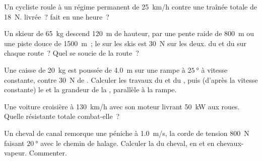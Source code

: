 \begin{exercise}[$\star\star$]\label{exo:g11:work-of-force:7}
Un cycliste roule à un régime permanent de \qty{25}{km/h} contre une
traînée totale de \qty{18}{N}.
 livrée~?
 fait en une heure~?
\end{exercise}

\begin{exercise}[$\star\star$]\label{exo:g11:work-of-force:8}
Un skieur de \qty{65}{kg} descend \qty{120}{m} de hauteur, par une pente
raide de \qty{800}{m} ou une piste douce de \qty{1500}{m}~; le
 sur les skis est \qty{30}{N} sur
les deux.  du
 et du
 sur chaque route~? Quel
 se soucie de la route~?
\end{exercise}

\begin{exercise}[$\star\star$]\label{exo:g11:work-of-force:9}
Une caisse de \qty{20}{kg} est poussée de \qty{4.0}{m} sur une rampe à
$\qty{25}{\degree}$ à vitesse constante, contre \qty{30}{N} de
. Calculer les
travaux du
 et du
, puis (d'après la vitesse
constante) le  et la grandeur de la
, parallèle à la rampe.
\end{exercise}

\begin{exercise}[$\star\star$]\label{exo:g11:work-of-force:10}
Une voiture croisière à \qty{130}{km/h} avec son moteur livrant
\qty{50}{kW} aux roues. Quelle
résistante totale combat-elle~?
\end{exercise}

\begin{exercise}[$\star\star$]\label{exo:g11:work-of-force:11}
Un cheval de canal remorque une péniche à \qty{1.0}{m/s}, la corde de
tension \qty{800}{N} faisant
$\qty{20}{\degree}$ avec le chemin de halage. Calculer la
 du cheval, en
 et en
chevaux-vapeur. Commenter.
\end{exercise}

